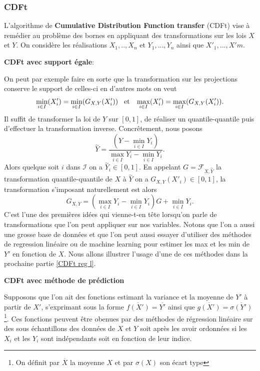 \documentclass[a4paper,11pt]{article}
\begin{document}
\subsubsection{CDFt}
\label{CDf-t-algo}

L'algorithme de \textbf{Cumulative Distribution Function transfer} (CDFt) vise à remédier au problème des bornes en appliquant des transformations sur les lois $X$ et $Y$. On considère les réalisations $X_1,..,X_n$ et $Y_1,...,Y_n$ ainsi que $X'_{1},...,X'{m}$.

\noindent \textbf{CDFt avec support égale}:

On peut par exemple faire en sorte que la transformation sur les projections conserve le support de celles-ci en d'autres mots on veut
\[ \min_{i \in I}(X'_i)=\min_{i \in I}(G_{X,Y}(X'_i)) \hspace{3mm} \textrm{et} \hspace{3mm}  \max_{i \in I}(X'_i)=\max_{i \in I}(G_{X,Y}(X'_i)).\]
Il suffit de transformer la loi de $Y$ sur $[0,1]$, de réaliser un quantile-quantile puis d'effectuer la transformation inverse. Concrêtement, nous posons 
\[\overset{\sim}{Y}= \frac{(Y-\min_{i\in I}Y_i)}{\max_{i\in I}Y_i- \min_{i\in I}Y_i}.\]
Alors quelque soit $i$ dans $\mathcal{I}$ on a $\overset{\sim}{Y}_i \in [0,1]$. En appelant $G= \mathcal{F}_{X,\overset{\sim}{Y}}$ la transformation quantile-quantile de $X$ à $\overset{\sim}{Y}$ on a $G_{X,Y}(X'_i) \in [0,1]$, la transformation s'imposant naturellement est alors
\[ G_{X,Y}= (\max_{i\in I}Y_i- \min_{i\in I}Y_i)G + \min_{i\in I}Y_i.\]
C'est l'une des premières idées qui vienne-t-en tête lorsqu'on parle de transformations que l'on peut appliquer sur nos variables. Notons que l'on a aussi une grosse base de données et que l'on peut aussi essayer d'utiliser des méthodes de regression linéaire ou de machine learning pour estimer les max et les min de $Y'$ en fonction de $X$. Nous allons illustrer l'usage d'une de ces méthodes dans la prochaine partie \ref{CDFt reg l}.

\noindent \textbf{CDFt avec méthode de prédiction}
\label{CDFt reg l}

Supposons que l'on ait des fonctions estimant la variance et la moyenne de $Y'$ à partir de $X'$, s'exprimant sous la forme $\overline{f(X')} = \overline{Y'}$ ainsi que $\overline{g(X')} = \overline{\sigma(Y')}$ \footnote{On définit par $\overline{X}$ la  moyenne $X$ et par $\sigma(X)$ son écart type}. Ces fonctions peuvent être obenues par des méthodes de régression linéaire sur des sous échantillons des données de $X$ et $Y$ soit après les avoir ordonnées si les $X_i$ et les $Y_i$ sont indépendants soit en fonction de leur indice.
\end{document}
